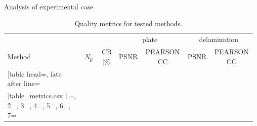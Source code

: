 \documentclass[10pt,aspectratio=169,dvipsnames]{beamer} %
\begin{document}
\begin{frame}{Analysis of experimental case}
	\begin{table}[!ht]
		\renewcommand{\arraystretch}{1.3}
		\centering \footnotesize
		\caption{Quality metrics for tested methods.}	
		\begin{tabular}{lrrrcrc} 
			\toprule[1.5pt]
			& & & \multicolumn{2}{c}{plate} & \multicolumn{2}{c}{delamination} \\
			\cmidrule(lr){4-5} \cmidrule(lr){6-7}
			Method & $N_p$ & CR [\%] & PSNR & PEARSON CC& PSNR & PEARSON CC \\
			\midrule
			\csvreader
			[table head=\toprule,
			late after line=\\ 
			]{table_metrics.csv}{
				1=\one, 2=\two, 3=\three, 4=\four, 5=\five, 6=\six, 7=\seven
			}%
			{\one & \two & \three & \four & \five & \six & \seven }%
			\bottomrule[1.5pt]
		\end{tabular}	
		\label{tab:csv_results_}
	\end{table}
\end{frame}
\end{document}
